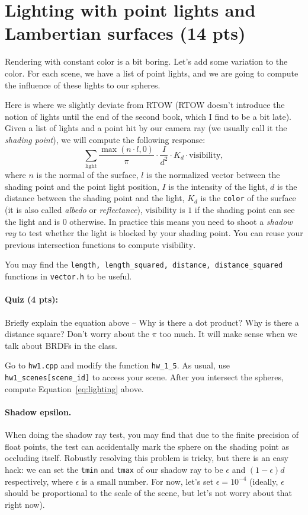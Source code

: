 \section{Lighting with point lights and Lambertian surfaces (14 pts)}
Rendering with constant color is a bit boring. Let's add some variation to the color. For each scene, we have a list of point lights, and we are going to compute the influence of these lights to our spheres.

Here is where we slightly deviate from RTOW (RTOW doesn't introduce the notion of lights until the end of the second book, which I find to be a bit late). Given a list of lights and a point hit by our camera ray (we usually call it the \emph{shading point}), we will compute the following response:
\begin{equation}
    \sum_{\text{light}} \frac{\max\left(n \cdot l, 0\right)}{\pi} \cdot \frac{I}{d^2} \cdot K_d \cdot \text{visibility},
    \label{eq:lighting}
\end{equation}
where $n$ is the normal of the surface, $l$ is the normalized vector between the shading point and the point light position, $I$ is the intensity of the light, $d$ is the distance between the shading point and the light, $K_d$ is the \lstinline{color} of the surface (it is also called \emph{albedo} or \emph{reflectance}), $\text{visibility}$ is $1$ if the shading point can see the light and is $0$ otherwise. In practice this means you need to shoot a \emph{shadow ray} to test whether the light is blocked by your shading point. You can reuse your previous intersection functions to compute $\text{visibility}$. 

You may find the \lstinline{length, length_squared, distance, distance_squared} functions in \lstinline{vector.h} to be useful.

\paragraph{Quiz (4 pts):} Briefly explain the equation above -- Why is there a dot product? Why is there a distance square? Don't worry about the $\pi$ too much. It will make sense when we talk about BRDFs in the class.

Go to \lstinline{hw1.cpp} and modify the function \lstinline{hw_1_5}. As usual, use \lstinline{hw1_scenes[scene_id]} to access your scene. After you intersect the spheres, compute Equation~\eqref{eq:lighting} above.

\paragraph{Shadow epsilon.} When doing the shadow ray test, you may find that due to the finite precision of float points, the test can accidentally mark the sphere on the shading point as occluding itself. Robustly resolving this problem is tricky, but there is an easy hack: we can set the \lstinline{tmin} and \lstinline{tmax} of our shadow ray to be $\epsilon$ and $\left(1 - \epsilon\right) d$ respectively, where $\epsilon$ is a small number. For now, let's set $\epsilon = 10^{-4}$ (ideally, $\epsilon$ should be proportional to the scale of the scene, but let's not worry about that right now).

